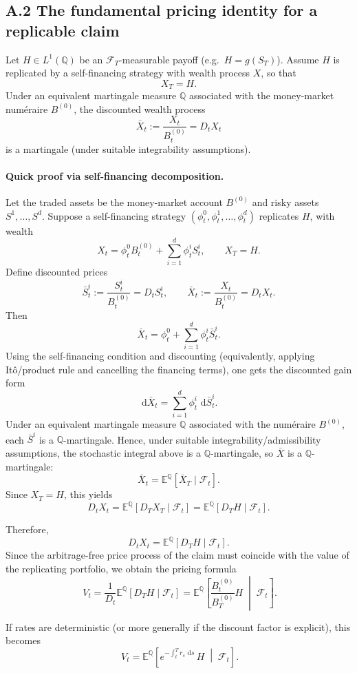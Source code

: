 \documentclass[11pt]{article}
\newcommand{\Qbb}{\mathbb{Q}}
\newcommand{\E}{\mathbb{E}}
\newcommand{\dd}{\,\mathrm{d}}
\newcommand{\1}{\mathbf{1}}
\begin{document}
\subsection*{A.2 The fundamental pricing identity for a replicable claim}

Let \(H\in L^1(\Qbb)\) be an \(\mathcal F_T\)-measurable payoff (e.g.\ \(H=g(S_T)\)).
Assume \(H\) is replicated by a self-financing strategy with wealth process \(X\), so that
$$
X_T = H.
$$
Under an equivalent martingale measure \(\Qbb\) associated with the money-market num\'eraire \(B^{(0)}\),
the discounted wealth process
$$
\bar X_t := \frac{X_t}{B_t^{(0)}} = D_tX_t
$$
is a martingale (under suitable integrability assumptions).

\paragraph{Quick proof via self-financing decomposition.}
Let the traded assets be the money-market account \(B^{(0)}\) and risky assets \(S^1,\dots,S^d\).
Suppose a self-financing strategy \((\phi_t^0,\phi_t^1,\dots,\phi_t^d)\) replicates \(H\), with wealth
$$
X_t=\phi_t^0 B_t^{(0)}+\sum_{i=1}^d \phi_t^i S_t^i,
\qquad X_T=H.
$$
Define discounted prices
$$
\bar S_t^i:=\frac{S_t^i}{B_t^{(0)}}=D_tS_t^i,
\qquad
\bar X_t:=\frac{X_t}{B_t^{(0)}}=D_tX_t.
$$
Then
$$
\bar X_t=\phi_t^0+\sum_{i=1}^d \phi_t^i \bar S_t^i.
$$
Using the self-financing condition and discounting (equivalently, applying It\^o/product rule and cancelling the financing terms), one gets the discounted gain form
$$
\dd \bar X_t=\sum_{i=1}^d \phi_t^i\,\dd \bar S_t^i.
$$
Under an equivalent martingale measure \(\Qbb\) associated with the num\'eraire \(B^{(0)}\), each \(\bar S^i\) is a \(\Qbb\)-martingale. Hence, under suitable integrability/admissibility assumptions, the stochastic integral above is a \(\Qbb\)-martingale, so \(\bar X\) is a \(\Qbb\)-martingale:
$$
\bar X_t=\E^{\Qbb}[\bar X_T\mid\mathcal F_t].
$$
Since \(X_T=H\), this yields
$$
D_tX_t=\E^{\Qbb}[D_TX_T\mid\mathcal F_t]
=\E^{\Qbb}[D_TH\mid\mathcal F_t].
$$



Therefore,
$$
D_tX_t = \E^{\Qbb}[D_TH \mid \mathcal F_t].
$$
Since the arbitrage-free price process of the claim must coincide with the value of the replicating portfolio,
we obtain the pricing formula
$$
\boxed{
\ V_t
=
\frac{1}{D_t}\E^{\Qbb}[D_TH\mid \mathcal F_t]
=
\E^{\Qbb}\!\left[\frac{B_t^{(0)}}{B_T^{(0)}}H\;\middle|\;\mathcal F_t\right].
}
$$

If rates are deterministic (or more generally if the discount factor is explicit),
this becomes
$$
\boxed{
\ V_t
=
\E^{\Qbb}\!\left[e^{-\int_t^T r_s\,\dd s}\,H\;\middle|\;\mathcal F_t\right].
}
$$
\end{document}
